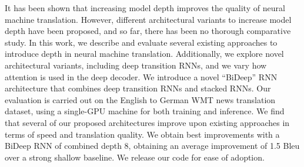 It has been shown that increasing model depth improves the quality of neural machine translation. However, different architectural variants to increase model depth have been proposed, and so far, there has been no thorough comparative study. In this work, we describe and evaluate several existing approaches to introduce depth in neural machine translation. Additionally, we explore novel architectural variants, including deep transition RNNs, and we vary how attention is used in the deep decoder. We introduce a novel ``BiDeep'' RNN architecture that combines deep transition RNNs and stacked RNNs. Our evaluation is carried out on the English to German WMT news translation dataset, using a single-GPU machine for both training and inference. We find that several of our proposed architectures improve upon existing approaches in terms of speed and translation quality. We obtain best improvements with a BiDeep RNN of combined depth 8, obtaining an average improvement of 1.5  Bleu over a strong shallow baseline. We release our code for ease of adoption.
